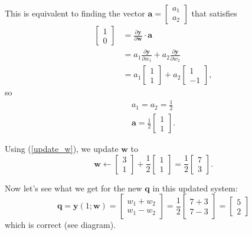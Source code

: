 \documentclass{article}
\let\vec\mathbf
\begin{document}
This is equivalent to finding the vector $\vec{a} = \begin{bmatrix} a_1 \\ a_2 \end{bmatrix}$ that satisfies
\begin{align*}
    \begin{bmatrix}
        1 \\
        0
    \end{bmatrix}
    &=
    \frac{\partial \vec{y}}{\partial \vec{w}} \cdot \vec{a}
    \\
    &=
    a_1
    \frac{\partial \vec{y}}{\partial w_1}
    +
    a_2
    \frac{\partial \vec{y}}{\partial w_2}
    \\
    &=
    a_1
    \begin{bmatrix}
        1 \\
        1
    \end{bmatrix}
    +
    a_2
    \begin{bmatrix}
        1 \\
        -1
    \end{bmatrix},
\end{align*}
so
\begin{align*}
    a_1 = a_2 = \frac{1}{2} \\
    \vec{a} =
    \frac{1}{2}
    \begin{bmatrix}
        1 \\
        1
    \end{bmatrix}.
\end{align*}

Using (\ref{update_w}), we update $\vec{w}$ to
\begin{equation*}
    \vec{w}
    \leftarrow
    \begin{bmatrix}
        3 \\
        1
    \end{bmatrix}
    +
    \frac{1}{2}
    \begin{bmatrix}
        1 \\
        1
    \end{bmatrix}
    =
    \frac{1}{2}
    \begin{bmatrix}
        7 \\
        3
    \end{bmatrix}.
\end{equation*}


Now let's see what we get for the new $\vec{q}$ in this updated system:
\begin{equation*}
    \vec{q} =
    \vec{y}(1; \vec{w}) =
    \begin{bmatrix}
        w_1 + w_2 \\
        w_1 - w_2
    \end{bmatrix} = 
    \frac{1}{2}
    \begin{bmatrix}
        7+3 \\
        7-3
    \end{bmatrix}
    =
    \begin{bmatrix}
        5 \\
        2
    \end{bmatrix}
\end{equation*}
which is correct (see diagram).
\end{document}
